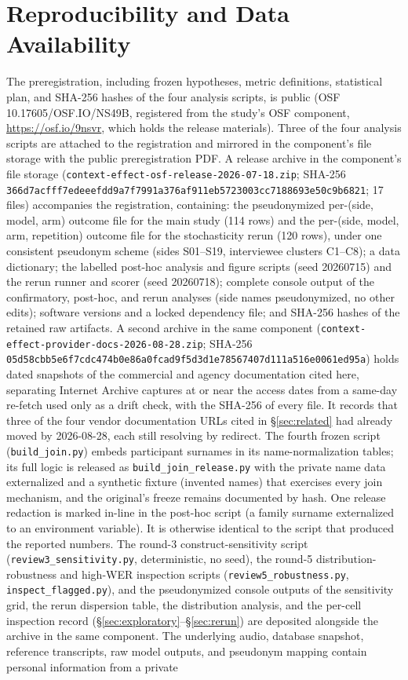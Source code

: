 \documentclass[11pt]{article}
\begin{document}
\section{Reproducibility and Data Availability}
\label{sec:repro}

The preregistration, including frozen hypotheses, metric definitions, statistical plan, and SHA-256 hashes of the four analysis scripts, is public (OSF 10.17605/OSF.IO/NS49B, registered from the study's OSF component, \url{https://osf.io/9nsvr}, which holds the release materials). Three of the four analysis scripts are attached to the registration and mirrored in the component's file storage with the public preregistration PDF. A release archive in the component's file storage (\texttt{context-effect-osf-release-2026-07-18.zip}; SHA-256 \texttt{366d7acfff7edeeefdd9a7f7991a376af911eb5723003cc7188693e50c9b6821}; 17 files) accompanies the registration, containing: the pseudonymized per-(side, model, arm) outcome file for the main study (114 rows) and the per-(side, model, arm, repetition) outcome file for the stochasticity rerun (120 rows), under one consistent pseudonym scheme (sides S01--S19, interviewee clusters C1--C8); a data dictionary; the labelled post-hoc analysis and figure scripts (seed 20260715) and the rerun runner and scorer (seed 20260718); complete console output of the confirmatory, post-hoc, and rerun analyses (side names pseudonymized, no other edits); software versions and a locked dependency file; and SHA-256 hashes of the retained raw artifacts. A second archive in the same component (\texttt{context-effect-provider-docs-2026-08-28.zip}; SHA-256 \texttt{05d58cbb5e6f7cdc474b0e86a0fcad9f5d3d1e78567407d111a516e0061ed95a}) holds dated snapshots of the commercial and agency documentation cited here, separating Internet Archive captures at or near the access dates from a same-day re-fetch used only as a drift check, with the SHA-256 of every file. It records that three of the four vendor documentation URLs cited in \S\ref{sec:related} had already moved by 2026-08-28, each still resolving by redirect. The fourth frozen script (\texttt{build\_join.py}) embeds participant surnames in its name-normalization tables; its full logic is released as \texttt{build\_join\_release.py} with the private name data externalized and a synthetic fixture (invented names) that exercises every join mechanism, and the original's freeze remains documented by hash. One release redaction is marked in-line in the post-hoc script (a family surname externalized to an environment variable). It is otherwise identical to the script that produced the reported numbers. The round-3 construct-sensitivity script (\texttt{review3\_sensitivity.py}, deterministic, no seed), the round-5 distribution-robustness and high-WER inspection scripts (\texttt{review5\_robustness.py}, \texttt{inspect\_flagged.py}), and the pseudonymized console outputs of the sensitivity grid, the rerun dispersion table, the distribution analysis, and the per-cell inspection record (\S\ref{sec:exploratory}--\S\ref{sec:rerun}) are deposited alongside the archive in the same component. The underlying audio, database snapshot, reference transcripts, raw model outputs, and pseudonym mapping contain personal information from a private 
\end{document}
